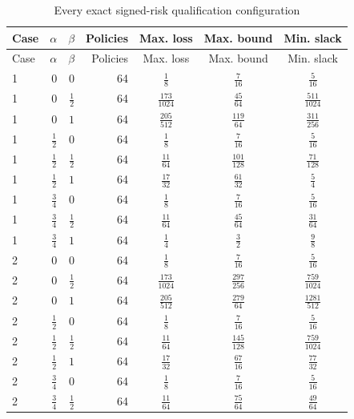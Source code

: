 {\small\setlength{\tabcolsep}{4pt}
\begin{longtable}{lrrrccc}
\caption{Every exact signed-risk qualification configuration}\label{tab:risk91}\\
\hline
Case & $\alpha$ & $\beta$ & Policies & Max. loss & Max. bound & Min. slack \\
\hline\endfirsthead
\hline
Case & $\alpha$ & $\beta$ & Policies & Max. loss & Max. bound & Min. slack \\
\hline\endhead
1 & $0$ & $0$ & 64 & $\frac{1}{8}$ & $\frac{7}{16}$ & $\frac{5}{16}$ \\[2pt]
1 & $0$ & $\frac{1}{2}$ & 64 & $\frac{173}{1024}$ & $\frac{45}{64}$ & $\frac{511}{1024}$ \\[2pt]
1 & $0$ & $1$ & 64 & $\frac{205}{512}$ & $\frac{119}{64}$ & $\frac{311}{256}$ \\[2pt]
1 & $\frac{1}{2}$ & $0$ & 64 & $\frac{1}{8}$ & $\frac{7}{16}$ & $\frac{5}{16}$ \\[2pt]
1 & $\frac{1}{2}$ & $\frac{1}{2}$ & 64 & $\frac{11}{64}$ & $\frac{101}{128}$ & $\frac{71}{128}$ \\[2pt]
1 & $\frac{1}{2}$ & $1$ & 64 & $\frac{17}{32}$ & $\frac{61}{32}$ & $\frac{5}{4}$ \\[2pt]
1 & $\frac{3}{4}$ & $0$ & 64 & $\frac{1}{8}$ & $\frac{7}{16}$ & $\frac{5}{16}$ \\[2pt]
1 & $\frac{3}{4}$ & $\frac{1}{2}$ & 64 & $\frac{11}{64}$ & $\frac{45}{64}$ & $\frac{31}{64}$ \\[2pt]
1 & $\frac{3}{4}$ & $1$ & 64 & $\frac{1}{4}$ & $\frac{3}{2}$ & $\frac{9}{8}$ \\[2pt]
2 & $0$ & $0$ & 64 & $\frac{1}{8}$ & $\frac{7}{16}$ & $\frac{5}{16}$ \\[2pt]
2 & $0$ & $\frac{1}{2}$ & 64 & $\frac{173}{1024}$ & $\frac{297}{256}$ & $\frac{759}{1024}$ \\[2pt]
2 & $0$ & $1$ & 64 & $\frac{205}{512}$ & $\frac{279}{64}$ & $\frac{1281}{512}$ \\[2pt]
2 & $\frac{1}{2}$ & $0$ & 64 & $\frac{1}{8}$ & $\frac{7}{16}$ & $\frac{5}{16}$ \\[2pt]
2 & $\frac{1}{2}$ & $\frac{1}{2}$ & 64 & $\frac{11}{64}$ & $\frac{145}{128}$ & $\frac{759}{1024}$ \\[2pt]
2 & $\frac{1}{2}$ & $1$ & 64 & $\frac{17}{32}$ & $\frac{67}{16}$ & $\frac{77}{32}$ \\[2pt]
2 & $\frac{3}{4}$ & $0$ & 64 & $\frac{1}{8}$ & $\frac{7}{16}$ & $\frac{5}{16}$ \\[2pt]
2 & $\frac{3}{4}$ & $\frac{1}{2}$ & 64 & $\frac{11}{64}$ & $\frac{75}{64}$ & $\frac{49}{64}$ \\[2pt]

\end{longtable}}
